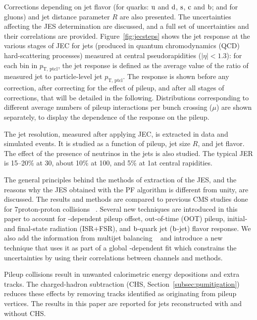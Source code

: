 \documentclass[11pt,twoside,a4paper,cmspaper,final,collab]{cms-tdr}
\begin{document}
 Corrections depending on jet flavor (for quarks: $\mathrm{u}$ and $\mathrm{d}$, $\mathrm{s}$, $\mathrm{c}$ and $\mathrm{b}$; and for gluons) and jet
distance parameter $R$ are also presented.  The uncertainties affecting the JES determination are discussed,
and a full set of uncertainties and their correlations are provided.
Figure~\ref{fig:jecsteps} shows the jet response at the various stages of JEC for jets (produced in quantum chromodynamics (QCD) hard-scattering processes) measured at central pseudorapidities ($\vert \eta\vert <1.3$): for each bin in $p_\text{T, ptcl}$, the jet response is defined as the average value of the ratio of measured jet \pt to particle-level jet $p_\text{T, ptcl}$. The response is shown before any correction, after correcting for the effect of pileup, and after all stages of corrections, that will be detailed in the following. Distributions corresponding to different average numbers of pileup interactions per bunch crossing ($\mu$) are shown separately, to display the dependence of the response on the pileup.



The jet \pt resolution, measured after applying JEC, is extracted in data and simulated events. It is studied as a function of pileup, jet size $R$, and jet flavor. The effect of the presence of neutrinos in the jets is also studied.
The typical JER is 15--20\% at 30\GeV, about 10\% at 100\GeV, and 5\% at 1\TeV at central rapidities.

The general principles behind the methods of extraction of the JES,
and the reasons why the JES obtained with the PF algorithm is different from unity,
are discussed. The results and methods are compared to previous CMS studies done for 7\TeV proton-proton collisions ~\cite{JEC_JINST}. Several new techniques are introduced in this paper to account
for \pt-dependent pileup offset, out-of-time (OOT) pileup, initial- and final-state radiation (ISR+FSR), and $\mathrm{b}$-quark jet
($\mathrm{b}$-jet) flavor response. We also add the information from multijet balancing ~\cite{Aad:2011he} and introduce a new technique that uses it as part of a global \pt-dependent fit which constrains the uncertainties by using their correlations between channels and methods.

Pileup collisions result in unwanted calorimetric energy depositions and extra tracks.
The charged-hadron subtraction (CHS, Section~\ref{subsec:pumitigation}) reduces these effects by removing tracks identified as originating from pileup vertices.
The results in this paper are reported for jets reconstructed with and without CHS.
\end{document}
